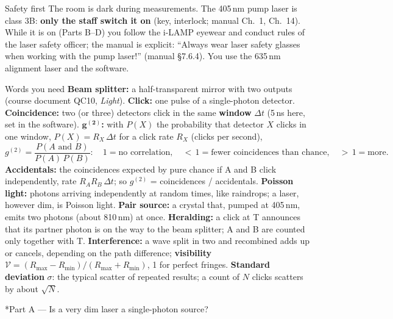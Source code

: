 \documentclass[a4paper,11pt]{article}
\makeatletter
\renewcommand\section{\@startsection{section}{1}{\z@}{-1.6ex \@plus -.5ex}{0.6ex}{\normalfont\large\bfseries\color{ibmblue}}}
\makeatother
\begin{document}
\begin{devbox}{Safety first}
The room is dark during measurements. The 405\,nm pump laser is class 3B: \textbf{only the
staff switch it on} (key, interlock; manual Ch.~1, Ch.~14). While it is on (Parts B--D) you follow the i-LAMP
eyewear and conduct rules of the laser safety officer; the manual is explicit: ``Always wear
laser safety glasses when working with the pump laser!'' (manual \S7.6.4). You use the
635\,nm alignment laser and the software.
\end{devbox}

\begin{labelbox}{Words you need}
\small
\textbf{Beam splitter:} a half-transparent mirror with two outputs (course document QC10,
\textit{Light}).
\textbf{Click:} one pulse of a single-photon detector. \textbf{Coincidence:} two (or three)
detectors click in the same \textbf{window} $\Delta t$ (5\,ns here, set in the software).
$\boldsymbol{g^{(2)}}$\textbf{:} with $P(X)$ the probability that detector $X$ clicks in
one window, $P(X) = R_X\,\Delta t$ for a click rate $R_X$ (clicks per second),
\[ g^{(2)} = \frac{P(A \text{ and } B)}{P(A)\,P(B)}: \quad
   1 = \text{no correlation},\quad {<}\,1 = \text{fewer coincidences than chance},\quad
   {>}\,1 = \text{more}. \]
\textbf{Accidentals:} the coincidences expected by pure chance if A and B click
independently, rate $R_A R_B\,\Delta t$; so $g^{(2)}$ = coincidences / accidentals.
\textbf{Poisson light:} photons arriving independently at random times, like raindrops; a
laser, however dim, is Poisson light. \textbf{Pair source:} a crystal that, pumped at
405\,nm, emits two photons (about 810\,nm) at once. \textbf{Heralding:} a click at T
announces that its partner photon is on the way to the beam splitter; A and B are counted
only together with T. \textbf{Interference:} a wave split in two and recombined adds up or
cancels, depending on the path difference; \textbf{visibility}
$\mathcal{V} = (R_{\max} - R_{\min})/(R_{\max} + R_{\min})$, 1 for perfect fringes.
\textbf{Standard deviation} $\sigma$: the typical scatter of repeated results; a count of
$N$ clicks scatters by about $\sqrt{N}$.
\end{labelbox}

\section*{Part A --- Is a very dim laser a single-photon source?}
\end{document}
